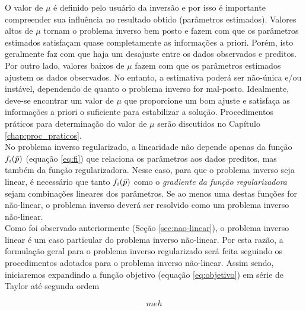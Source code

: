 \noindent O valor de $\mu$ é definido pelo usuário da inversão e por isso é
importante compreender sua influência no resultado obtido (parâmetros estimados).
Valores altos de $\mu$ tornam o problema inverso bem posto e fazem com que os
parâmetros estimados satisfaçam quase completamente as informações a priori.
Porém, isto geralmente faz com que haja um desajuste entre os dados observados e
preditos.
Por outro lado, valores baixos de $\mu$ fazem com que os parâmetros estimados
ajustem os dados observados. No entanto, a estimativa poderá ser não-única e/ou
instável, dependendo de quanto o problema inverso for mal-posto.
Idealmente, deve-se encontrar um valor de $\mu$ que proporcione um bom ajuste e
satisfaça as informações a priori o suficiente para estabilizar a solução.
Procedimentos práticos para determinação do valor de $\mu$ serão discutidos no
Capítulo \ref{chap:proc_praticos}.
\\
\indent No problema inverso regularizado, a linearidade não depende apenas da
função $f_i(\bar{p})$ (equação \ref{eq:fi}) que relaciona os parâmetros aos
dados preditos, mas também da função regularizadora.
Nesse caso, para que o problema inverso seja linear, é necessário que tanto
$f_i(\bar{p})$ como o {\it gradiente da função regularizadora} sejam
combinações lineares dos parâmetros.
Se ao menos uma destas funções for não-linear, o problema inverso deverá ser
resolvido como um problema inverso não-linear.
\\
\indent Como foi observado anteriormente (Seção \ref{sec:nao-linear}), o
problema inverso linear é um caso particular do problema inverso não-linear.
Por esta razão, a formulação geral para o problema inverso regularizado
será feita seguindo os procedimentos adotados para o problema inverso não-linear.
Assim sendo, iniciaremos expandindo a função objetivo (equação
\ref{eq:objetivo}) em série de Taylor até segunda ordem

\begin{equation}
meh
\end{equation}
















